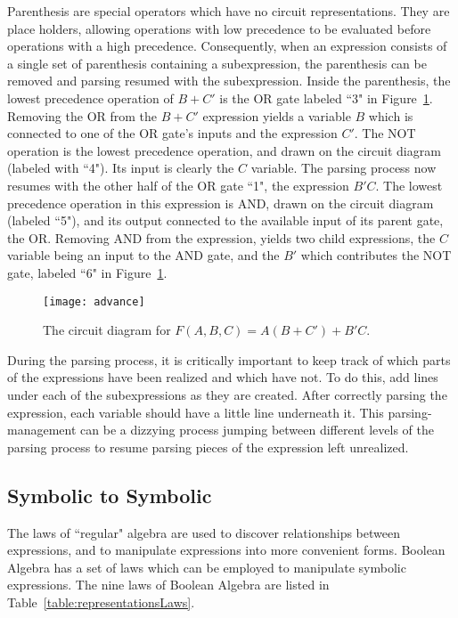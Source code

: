 Parenthesis are special
operators which have no circuit representations.  They are place holders,
allowing operations with low precedence to be evaluated before operations 
with a high precedence.  Consequently, when an expression consists of
a single set of parenthesis containing a subexpression, the parenthesis
can be removed and parsing resumed with the subexpression.  Inside the 
parenthesis, the lowest precedence operation of $B+C'$ is the OR gate 
labeled ``3" in Figure~\ref{fig:representationsAdvance}.  Removing the OR from the 
$B+C'$ expression yields a variable $B$ which is connected to one of the
OR gate's inputs and the expression $C'$.  The NOT operation is the lowest
precedence operation, and drawn on the circuit diagram (labeled with ``4").
Its input is clearly the $C$ variable.  The parsing process now resumes
with the other half of the OR gate ``1", the expression $B'C$.  The lowest
precedence operation in this expression is AND, drawn on the circuit 
diagram (labeled ``5"), and its output connected to the available input 
of its parent gate, the OR.  Removing AND from the expression, yields two
child expressions, the $C$ variable being an input to the AND gate, and the
$B'$ which contributes the NOT gate, labeled ``6" in Figure~\ref{fig:representationsAdvance}.  

\begin{figure}[ht]
\texttt{[image: advance]}
\caption{The circuit diagram for $F(A,B,C)=A(B+C')+B'C$.}
\label{fig:representationsAdvance}
\end{figure}

During the parsing process, it is critically important to keep track of which 
parts of the expressions have been realized and which have not.  To 
do this, add lines under each of the subexpressions as they are created.
After correctly parsing the expression, each variable should have a little
line underneath it.  This parsing-management can be a dizzying process 
jumping between different levels of the parsing process to resume 
parsing pieces of the expression left unrealized.

\subsection{Symbolic to Symbolic}
The laws of ``regular" algebra are used to discover relationships
between expressions, and to manipulate expressions into more convenient forms.  
Boolean Algebra has a set of laws which can be employed to manipulate 
symbolic expressions.  The nine laws of Boolean Algebra are listed in 
Table~\ref{table:representationsLaws}.

